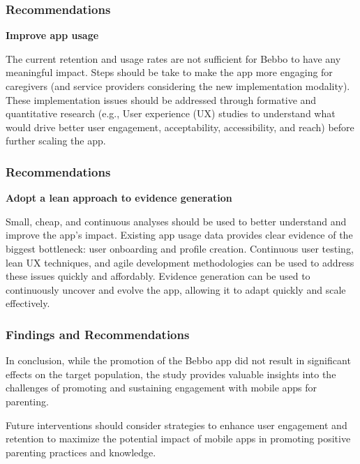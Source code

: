 \documentclass[aspectratio=169]{beamer}
\begin{document}
\begin{frame}
     \frametitle{Recommendations}
\textbf{Improve app usage}

The current retention and usage rates are not sufficient for Bebbo to have any meaningful impact. Steps should be take to make the app more engaging for caregivers (and service providers considering the new implementation modality). These implementation issues should be addressed through formative and quantitative research  (e.g., User experience (UX) studies to understand what would drive better user engagement, acceptability, accessibility, and reach) before further scaling the app.  

\end{frame}

\begin{frame}
\frametitle{Recommendations}       

\textbf{Adopt a lean approach to evidence generation}

Small, cheap, and continuous analyses should be used to better understand and improve the app's impact. Existing app usage data provides clear evidence of the biggest bottleneck: user onboarding and profile creation. Continuous user testing, lean UX techniques, and agile development methodologies can be used to address these issues quickly and affordably. Evidence generation can be used to continuously uncover and evolve the app, allowing it to adapt quickly and scale effectively. 

\end{frame}

\begin{frame}
   \frametitle{Findings and Recommendations}

  In conclusion, while the promotion of the Bebbo app did not result in significant effects on the target population, the study provides valuable insights into the challenges of promoting and sustaining engagement with mobile apps for parenting. 

Future interventions should consider strategies to enhance user engagement and retention to maximize the potential impact of mobile apps in promoting positive parenting practices and knowledge. 
\end{frame}
\end{document}
